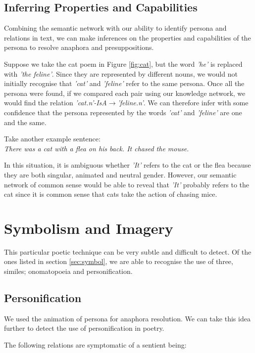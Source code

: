\subsection{Inferring Properties and Capabilities}

Combining the semantic network with our ability to identify persona and relations in text, we can make inferences on the properties and capabilities of the persona to resolve anaphora and presuppositions.

Suppose we take the cat poem in Figure \ref{fig:cat}, but the word \textit{'he'} is replaced with \textit{'the feline'}. Since they are represented by different nouns, we would not initially recognise that \textit{'cat'} and \textit{'feline'} refer to the same persona. Once all the persona were found, if we compared each pair using our knowledge network, we would find the relation \textit{'cat.n'-IsA$\rightarrow$'feline.n'}. We can therefore infer with some confidence that the persona represented by the words \textit{'cat'} and \textit{'feline'} are one and the same.

Take another example sentence:\\
\textit{There was a cat with a flea on his back. It chased the mouse.}

In this situation, it is ambiguous whether \textit{'It'} refers to the cat or the flea because they are both singular, animated and neutral gender. However, our semantic network of common sense would be able to reveal that \textit{'It'} probably refers to the cat since it is common sense that cats take the action of chasing mice.

\section{Symbolism and Imagery}

This particular poetic technique can be very subtle and difficult to detect. Of the ones listed in section \ref{sec:symbol}, we are able to recognise the use of three, similes; onomatopoeia and personification.

\subsection{Personification}

We used the animation of persona for anaphora resolution. We can take this idea further to detect the use of personification in poetry.

The following relations are symptomatic of a sentient being:


